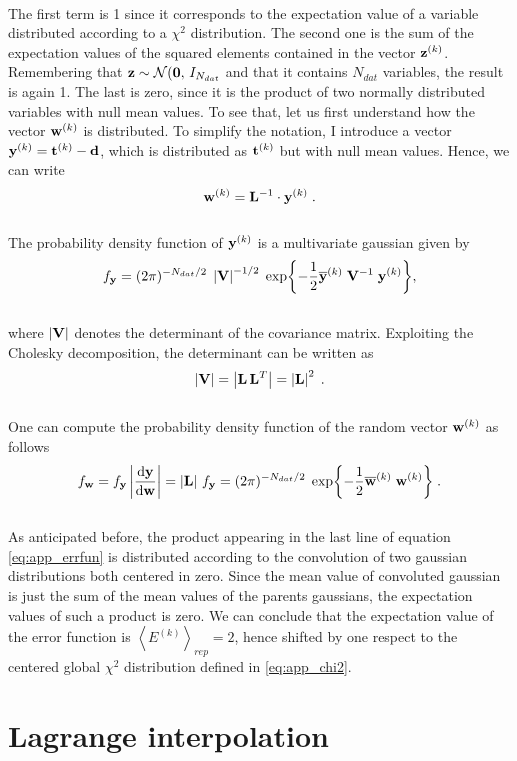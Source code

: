 \documentclass[../main.tex]{subfiles}
\begin{document}
\\
The first term is 1 since it corresponds to the expectation value of a variable distributed according to a $\chi^2$ distribution. The second one is the sum of the expectation values of the squared elements contained in the vector $\mathbf{z}^{(k)}$. Remembering that $\mathbf{z} \sim \mathcal{N}(\mathbf{0},\, I_{N_{dat}}$ and that it contains $N_{dat}$ variables, the result is again 1. The last is zero, since it is the product of two normally distributed variables with null mean values. To see that, let us first understand how the vector $\mathbf{w}^{(k)}$ is distributed. To simplify the notation, I introduce a vector $\mathbf{y}^{(k)} = \mathbf{t}^{(k)} - \mathbf{d}$, which is distributed as $\mathbf{t}^{(k)}$ but with null mean values. Hence, we can write
\\
\begin{equation}
    \mathbf{w}^{(k)} = \mathbf{L}^{-1} \cdot \mathbf{y}^{(k)} \;.
\end{equation}
\\
The probability density function of $\mathbf{y}^{(k)}$ is a multivariate gaussian given by
\\
\begin{equation}
    f_{\mathbf{y}} = (2\pi)^{-N_{dat}/2} \; \left| \mathbf{V} \right|^{-1/2} \; \exp{-\frac{1}{2}\overline{\mathbf{y}}^{(k)} \; \mathbf{V}^{-1} \; \mathbf{y}^{(k)}},
\end{equation}
\\
where $\left| \mathbf{V} \right|$ denotes the determinant of the covariance matrix. Exploiting the Cholesky decomposition, the determinant can be written as 
\\
\begin{equation}
    \left| \mathbf{V} \right| = \left| \mathbf{L} \, \mathbf{L}^T \right| = \left| \mathbf{L} \right|^2 \;.
\end{equation}
\\
One can compute the probability density function of the random vector $\mathbf{w}^{(k)}$ as follows
\\
\begin{equation}
    f_{\mathbf{w}} = f_{\mathbf{y}} \left| \dv{\mathbf{y}}{\mathbf{w}} \right| = \left|\mathbf{L} \right| \, f_{\mathbf{y}} = (2\pi)^{-N_{dat}/2} \; \exp{-\frac{1}{2}\overline{\mathbf{w}}^{(k)} \; \mathbf{w}^{(k)}} \; .
\end{equation}
\\
As anticipated before, the product appearing in the last line of equation \eqref{eq:app_errfun} is distributed according to the convolution of two gaussian distributions both centered in zero. Since the mean value of convoluted gaussian is just the sum of the mean values of the parents gaussians, the expectation values of such a product is zero. We can conclude that the expectation value of the error function is $\left< E^{(k)} \right>_{rep}=2$, hence shifted by one respect to the centered global $\chi^2$ distribution defined in \eqref{eq:app_chi2}. 

\chapter{Lagrange interpolation}
\end{document}
